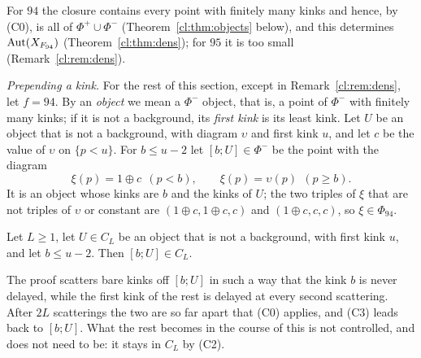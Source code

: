 For $94$ the closure contains every point with finitely many kinks and hence, by (C0), is all of $\Phi^+\cup\Phi^-$ (Theorem~\ref{cl:thm:objects} below), and this determines $\operatorname{Aut}(X_{F_{94}})$ (Theorem~\ref{cl:thm:dens}); for $95$ it is too small (Remark~\ref{cl:rem:dens}).

\emph{Prepending a kink.} For the rest of this section, except in Remark~\ref{cl:rem:dens}, let $f=94$. By an \emph{object} we mean a $\Phi^-$ object, that is, a point of $\Phi^-$ with finitely many kinks; if it is not a background, its \emph{first kink} is its least kink. Let $U$ be an object that is not a background, with diagram $\upsilon$ and first kink $u$, and let $c$ be the value of $\upsilon$ on $\{p<u\}$. For $b\le u-2$ let $[b;U]\in\Phi^-$ be the point with the diagram
\[
\xi(p)=1\oplus c\ \ (p<b),\qquad \xi(p)=\upsilon(p)\ \ (p\ge b).
\]
It is an object whose kinks are $b$ and the kinks of $U$; the two triples of $\xi$ that are not triples of $\upsilon$ or constant are $(1\oplus c,1\oplus c,c)$ and $(1\oplus c,c,c)$, so $\xi\in\Phi_{94}$.

\begin{lemma}\label{cl:lem:prepend}
Let $L\ge1$, let $U\in C_L$ be an object that is not a background, with first kink $u$, and let $b\le u-2$. Then $[b;U]\in C_L$.
\end{lemma}

The proof scatters bare kinks off $[b;U]$ in such a way that the kink $b$ is never delayed, while the first kink of the rest is delayed at every second scattering. After $2L$ scatterings the two are so far apart that (C0) applies, and (C3) leads back to $[b;U]$. What the rest becomes in the course of this is not controlled, and does not need to be: it stays in $C_L$ by (C2).

